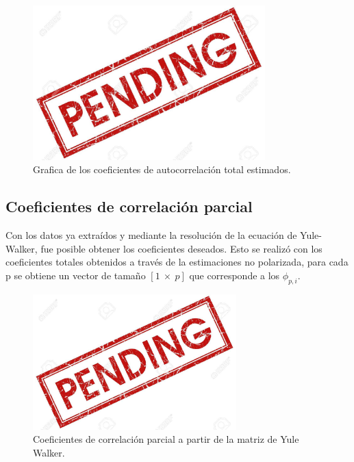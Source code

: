 \begin{figure}[H]
\centering
	\includegraphics[width=0.8\textwidth, trim = {0 0 0 0},clip]{./Imagenes/pend.jpg}
	\caption{Grafica de los coeficientes de autocorrelación total estimados.}
	\label{fig:rxx}
\end{figure}



\subsection{Coeficientes de correlación parcial}

Con los datos ya extraídos y mediante la resolución de la ecuación de Yule-Walker, fue posible obtener los coeficientes deseados. Esto se realizó con los coeficientes totales obtenidos a través de la estimaciones no polarizada, para cada p se obtiene un vector de tamaño $\left[ 1 \ \times \ p \right]$ que corresponde a los $\phi_{p,i}$.
\begin{figure}[H]
\centering

	\includegraphics[width=0.7\textwidth, trim = {0 0 0 0},clip]{./Imagenes/pend.jpg}
	\caption{Coeficientes de correlación parcial a partir de la matriz de Yule Walker.}

	\label{fig:phikk}
\end{figure}

